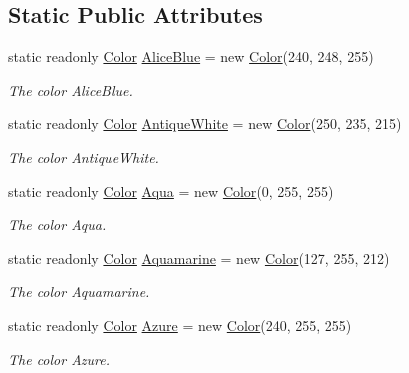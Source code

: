 \subsection*{Static Public Attributes}
\begin{DoxyCompactItemize}
\item 
static readonly \hyperlink{struct_tri_devs_1_1_tri_engine_1_1_color}{Color} \hyperlink{struct_tri_devs_1_1_tri_engine_1_1_color_a42f2a5c770b9924727bb7cacb2f6400e}{Alice\-Blue} = new \hyperlink{struct_tri_devs_1_1_tri_engine_1_1_color}{Color}(240, 248, 255)
\begin{DoxyCompactList}\small\item\em The color Alice\-Blue. \end{DoxyCompactList}\item 
static readonly \hyperlink{struct_tri_devs_1_1_tri_engine_1_1_color}{Color} \hyperlink{struct_tri_devs_1_1_tri_engine_1_1_color_ad8aa2a361231a1dea62b16ade16a5a5e}{Antique\-White} = new \hyperlink{struct_tri_devs_1_1_tri_engine_1_1_color}{Color}(250, 235, 215)
\begin{DoxyCompactList}\small\item\em The color Antique\-White. \end{DoxyCompactList}\item 
static readonly \hyperlink{struct_tri_devs_1_1_tri_engine_1_1_color}{Color} \hyperlink{struct_tri_devs_1_1_tri_engine_1_1_color_a50641019b4572d17fc2a543669b12104}{Aqua} = new \hyperlink{struct_tri_devs_1_1_tri_engine_1_1_color}{Color}(0, 255, 255)
\begin{DoxyCompactList}\small\item\em The color Aqua. \end{DoxyCompactList}\item 
static readonly \hyperlink{struct_tri_devs_1_1_tri_engine_1_1_color}{Color} \hyperlink{struct_tri_devs_1_1_tri_engine_1_1_color_af54538bbc650d0c3b6f10b434a28a6ed}{Aquamarine} = new \hyperlink{struct_tri_devs_1_1_tri_engine_1_1_color}{Color}(127, 255, 212)
\begin{DoxyCompactList}\small\item\em The color Aquamarine. \end{DoxyCompactList}\item 
static readonly \hyperlink{struct_tri_devs_1_1_tri_engine_1_1_color}{Color} \hyperlink{struct_tri_devs_1_1_tri_engine_1_1_color_a7adf069c5dc847a4abeafdd826062974}{Azure} = new \hyperlink{struct_tri_devs_1_1_tri_engine_1_1_color}{Color}(240, 255, 255)
\begin{DoxyCompactList}\small\item\em The color Azure. \end{DoxyCompactList}\item 

\end{DoxyCompactItemize}
